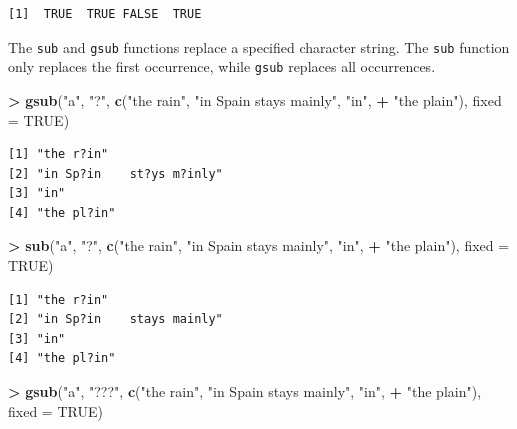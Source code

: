 \documentclass[
]{krantz}
\makeatletter
\newenvironment{Shaded}{\begin{snugshade}}{\end{snugshade}}
\newcommand{\DataTypeTok}[1]{\textcolor[rgb]{0.27,0.27,0.27}{#1}}
\newcommand{\KeywordTok}[1]{\textcolor[rgb]{0.27,0.27,0.27}{\textbf{#1}}}
\newcommand{\NormalTok}[1]{#1}
\newcommand{\OperatorTok}[1]{\textcolor[rgb]{0.43,0.43,0.43}{\textbf{#1}}}
\newcommand{\OtherTok}[1]{\textcolor[rgb]{0.37,0.37,0.37}{#1}}
\newcommand{\StringTok}[1]{\textcolor[rgb]{0.5,0.5,0.5}{#1}}
\newenvironment{kframe}{%
\medskip{}
\setlength{\fboxsep}{.8em}
 \def\at@end@of@kframe{}%
 \ifinner\ifhmode%
  \def\at@end@of@kframe{\end{minipage}}%
  \begin{minipage}{\columnwidth}%
 \fi\fi%
 \def\FrameCommand##1{\hskip\@totalleftmargin \hskip-\fboxsep
 \colorbox{shadecolor}{##1}\hskip-\fboxsep
     \hskip-\linewidth \hskip-\@totalleftmargin \hskip\columnwidth}%
 \MakeFramed {\advance\hsize-\width
   \@totalleftmargin\z@ \linewidth\hsize
   \@setminipage}}%
 {\par\unskip\endMakeFramed%
 \at@end@of@kframe}
\renewenvironment{Shaded}{\begin{kframe}}{\end{kframe}}
\makeatother
\begin{document}
\begin{verbatim}
[1]  TRUE  TRUE FALSE  TRUE
\end{verbatim}

The \texttt{sub} and \texttt{gsub} functions replace a specified character string. The \texttt{sub} function only replaces the first occurrence, while \texttt{gsub} replaces all occurrences.

\begin{Shaded}
\begin{Highlighting}[]
\OperatorTok{\textgreater{}}\StringTok{ }\KeywordTok{gsub}\NormalTok{(}\StringTok{"a"}\NormalTok{, }\StringTok{"?"}\NormalTok{, }\KeywordTok{c}\NormalTok{(}\StringTok{"the rain"}\NormalTok{, }\StringTok{"in Spain    stays mainly"}\NormalTok{, }\StringTok{"in"}\NormalTok{, }
\OperatorTok{+}\StringTok{                  "the plain"}\NormalTok{), }\DataTypeTok{fixed =} \OtherTok{TRUE}\NormalTok{)}
\end{Highlighting}
\end{Shaded}

\begin{verbatim}
[1] "the r?in"                
[2] "in Sp?in    st?ys m?inly"
[3] "in"                      
[4] "the pl?in"               
\end{verbatim}

\begin{Shaded}
\begin{Highlighting}[]
\OperatorTok{\textgreater{}}\StringTok{ }\KeywordTok{sub}\NormalTok{(}\StringTok{"a"}\NormalTok{, }\StringTok{"?"}\NormalTok{, }\KeywordTok{c}\NormalTok{(}\StringTok{"the rain"}\NormalTok{, }\StringTok{"in Spain    stays mainly"}\NormalTok{, }\StringTok{"in"}\NormalTok{, }
\OperatorTok{+}\StringTok{                 "the plain"}\NormalTok{), }\DataTypeTok{fixed =} \OtherTok{TRUE}\NormalTok{)}
\end{Highlighting}
\end{Shaded}

\begin{verbatim}
[1] "the r?in"                
[2] "in Sp?in    stays mainly"
[3] "in"                      
[4] "the pl?in"               
\end{verbatim}

\begin{Shaded}
\begin{Highlighting}[]
\OperatorTok{\textgreater{}}\StringTok{ }\KeywordTok{gsub}\NormalTok{(}\StringTok{"a"}\NormalTok{, }\StringTok{"???"}\NormalTok{, }\KeywordTok{c}\NormalTok{(}\StringTok{"the rain"}\NormalTok{, }\StringTok{"in Spain    stays mainly"}\NormalTok{, }\StringTok{"in"}\NormalTok{, }
\OperatorTok{+}\StringTok{                    "the plain"}\NormalTok{), }\DataTypeTok{fixed =} \OtherTok{TRUE}\NormalTok{)}
\end{Highlighting}
\end{Shaded}
\end{document}
